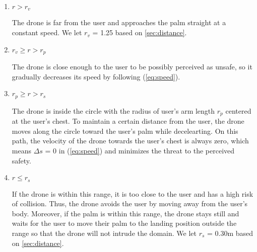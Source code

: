 \begin{enumerate}
    \item $r > r_v$
    
    The drone is far from the user and approaches the palm straight at a constant speed.
    We let $r_v$ = 1.25 based on \ref{sec:distance}.

    \item $r_v \geq r > r_p$
    
    The drone is close enough to the user to be possibly perceived as unsafe, so it gradually decreases its speed by following (\ref{eq:speed}).

    \item $r_p \geq r > r_s$
    
    The drone is inside the circle with the radius of user's arm length $r_p$ centered at the user's chest.
    To maintain a certain distance from the user, the drone moves along the circle toward the user's palm while decelearting.
    On this path, the velocity of the drone towards the user's chest is always zero,
    which means $\Delta s$ = 0 in (\ref{eq:speed}) and minimizes the threat to the perceived safety.

    \item $r \leq r_s$
    \label{sec:innermost}
    
    If the drone is within this range, it is too close to the user and has a high risk of collision.
    Thus, the drone avoids the user by moving away from the user's body.
    Moreover, if the palm is within this range, the drone stays still and waits for the user to move their palm to the landing position outside the range so that the drone will not intrude the domain.
    We let $r_s$ = 0.30m based on \ref{sec:distance}.

\end{enumerate}